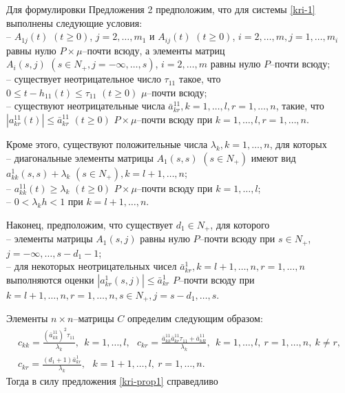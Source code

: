 Для формулировки Предложения 2 предположим, что для системы \eqref{kri-1}
выполнены следующие условия:\\
\noindent
  -- $A_{1j}(t) \,\, (t \geq 0)$, $j = 2,\dots,m_1$ и $A_{ij}(t) \,\, (t
\geq 0)$, $i = 2,\dots,m, j = 1,\dots,m_i$ равны нулю $P\times
\mu$--почти всюду, а элементы матриц $A_i(s,j)\,\, (s \in N_+,
j=-\infty,\dots,s)$, $i=2,\dots,m$  равны нулю $P$--почти всюду;\\
  -- существует неотрицательное число $\tau_{11}$ такое, что $0 \leq
t- h_{11}(t) \leq \tau _{11} {\,} {\,} (t \geq 0)$ $\mu $--почти
всюду;\\
  -- существуют неотрицательные числа $\bar
a^{11}_{kr}, k =1,\dots,l, r = 1,\dots,n$,  такие, что
  $|a^{11}_{kr}(t)|\leq \bar a^{11}_{kr} \,\, (t\geq 0) $
$P\times\mu$--почти всюду при $k =1,\dots,l, r = 1,\dots,n$.

 Кроме этого, существуют положительные числа $\lambda _k, k = 1, \dots, n$, для которых\\
 \noindent
-- диагональные элементы матрицы $ A_1(s,s)$
$(s \in N_+)$ имеют вид $a_{kk}^{1}(s,s) + \lambda _k \,\, (s \in
N_+), k=l + 1, \dots, n$;\\
   -- $a^{11}_{kk}(t) \geq \lambda _k \,\, (t\geq 0)$
$P\times\mu$--почти всюду при $k = 1,\dots,l$;\\
   -- $0 < \lambda _kh < 1$ при $ k = l + 1, \dots, n$.

 Наконец, предположим, что существует $d_1 \in N_+$, для которого\\
 \noindent
  -- элементы
матрицы $A_1(s,j)$ равны нулю $P$--почти всюду при $ s \in N_+$,
$j=-\infty,\dots,s-d_1-1$;\\
 -- для некоторых неотрицательных чисел $\bar a^1_{kr}, k = l+1, \dots,
n, r = 1,\dots,n$ выполняются оценки $|a^1_{kr}(s,j)| \leq \bar
a^1_{kr}$ $P$--почти всюду при $ k = l+1, \dots, n, r = 1,\dots,n, s\in
N_+, j=s-d_1,\dots,s $.

Элементы $n\times n$--матрицы $C$ определим следующим образом:
$$
\begin{array}{crl}
c_{kk} = \frac{(\bar a^{11}_{kk})^2\tau_{11}}{\lambda _k }, \ \ k =
1,\dots,l, \ \ \ c_{kr} = \frac{\bar a^{11}_{kk}\bar a^{11}_{kr}\tau
_{11} + \bar a^{11}_{kR}}{\lambda _k }, \ \ k =
1,\dots,l,\ r = 1, \dots, n, \ k \neq r,\\
 c_{kr} = \frac{(d_1+1)\bar a^{1}_{kr}}{\lambda_k}, \ \ \ k = 1 + 1,\dots,l, \ r = 1, \dots,
 n.
\end{array}
$$
Тогда в силу предложения \ref{kri-prop1} справедливо

